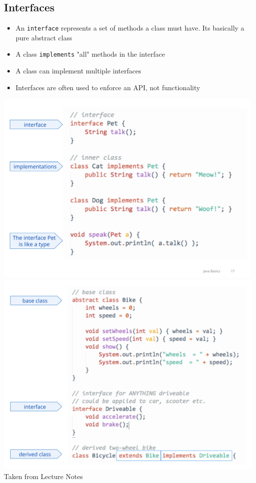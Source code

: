 \documentclass[twoside]{article}
\begin{document}
\subsection{Interfaces}
\begin{itemize}
\item An \verb|interface| represents a set of methods a class must have. Its basically a pure abstract class 
\item A class \verb|implements| "all" methods in the interface
\item A class can implement multiple interfaces
\item Interfaces are often used to enforce an API, not functionality 
\end{itemize}

\begin{center}
\includegraphics[scale=0.2]{14}\\
\includegraphics[scale=0.2]{15}\\
Taken from Lecture Notes
\end{center}
\end{document}
